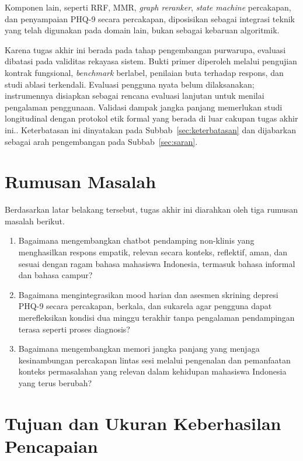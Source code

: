 Komponen lain, seperti RRF, MMR, \textit{graph reranker}, \textit{state machine} percakapan, dan penyampaian PHQ-9 secara percakapan, diposisikan sebagai integrasi teknik yang telah digunakan pada domain lain, bukan sebagai kebaruan algoritmik.

Karena tugas akhir ini berada pada tahap pengembangan purwarupa, evaluasi dibatasi pada validitas rekayasa sistem. Bukti primer diperoleh melalui pengujian kontrak fungsional, \textit{benchmark} berlabel, penilaian buta terhadap respons, dan studi ablasi terkendali. Evaluasi pengguna nyata belum dilaksanakan; instrumennya disiapkan sebagai rencana evaluasi lanjutan untuk menilai pengalaman penggunaan. Validasi dampak jangka panjang memerlukan studi longitudinal dengan protokol etik formal yang berada di luar cakupan tugas akhir ini\ifdefined\seminarhasilmode.\else. Keterbatasan ini dinyatakan pada Subbab~\ref{sec:keterbatasan} dan dijabarkan sebagai arah pengembangan pada Subbab~\ref{sec:saran}.\fi
\section{Rumusan Masalah}
\label{sec:rumusan-masalah}

Berdasarkan latar belakang tersebut, tugas akhir ini diarahkan oleh tiga rumusan masalah berikut.

\begin{enumerate}[label=\arabic*.,leftmargin=*,itemsep=4pt]
  \item Bagaimana mengembangkan chatbot pendamping non-klinis yang menghasilkan respons empatik, relevan secara konteks, reflektif, aman, dan sesuai dengan ragam bahasa mahasiswa Indonesia, termasuk bahasa informal dan bahasa campur?

  \item Bagaimana mengintegrasikan mood harian dan asesmen skrining depresi PHQ-9 secara percakapan, berkala, dan sukarela agar pengguna dapat merefleksikan kondisi dua minggu terakhir tanpa pengalaman pendampingan terasa seperti proses diagnosis?

  \item Bagaimana mengembangkan memori jangka panjang yang menjaga kesinambungan percakapan lintas sesi melalui pengenalan dan pemanfaatan konteks permasalahan yang relevan dalam kehidupan mahasiswa Indonesia yang terus berubah?
\end{enumerate}

\section{Tujuan dan Ukuran Keberhasilan Pencapaian}
\label{sec:tujuan}

